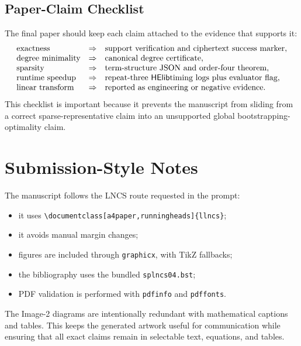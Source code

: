 \documentclass[a4paper,runningheads]{llncs}
\newcommand{\HElib}{\textsf{HElib}}
\begin{document}
\subsection{Paper-Claim Checklist}

The final paper should keep each claim attached to the evidence that supports
it:
\[
\begin{array}{lll}
\text{exactness} & \Rightarrow & \text{support verification and ciphertext success marker},\\
\text{degree minimality} & \Rightarrow & \text{canonical degree certificate},\\
\text{sparsity} & \Rightarrow & \text{term-structure JSON and order-four theorem},\\
\text{runtime speedup} & \Rightarrow & \text{repeat-three \HElib timing logs plus evaluator flag},\\
\text{linear transform} & \Rightarrow & \text{reported as engineering or negative evidence}.
\end{array}
\]
This checklist is important because it prevents the manuscript from sliding
from a correct sparse-representative claim into an unsupported global
bootstrapping-optimality claim.

\section{Submission-Style Notes}
\label{app:submission-style}

The manuscript follows the LNCS route requested in the prompt:
\begin{itemize}[leftmargin=*]
  \item it uses \verb|\documentclass[a4paper,runningheads]{llncs}|;
  \item it avoids manual margin changes;
  \item figures are included through \verb|graphicx|, with TikZ fallbacks;
  \item the bibliography uses the bundled \verb|splncs04.bst|;
  \item PDF validation is performed with \verb|pdfinfo| and \verb|pdffonts|.
\end{itemize}
The Image-2 diagrams are intentionally redundant with mathematical captions
and tables.  This keeps the generated artwork useful for communication while
ensuring that all exact claims remain in selectable text, equations, and
tables.



\end{document}
